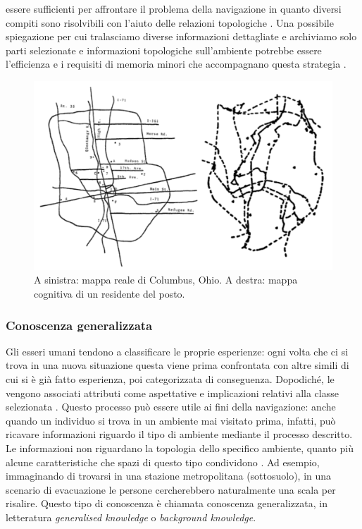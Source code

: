 \documentclass[12pt,a4paper,openright,oneside]{book}
\begin{document}
essere sufficienti per affrontare il problema della navigazione in quanto diversi compiti sono risolvibili con l'aiuto delle relazioni topologiche \cite{Ellard2009}. Una  possibile spiegazione per cui tralasciamo diverse informazioni dettagliate e archiviamo solo parti selezionate e informazioni topologiche sull'ambiente potrebbe essere l'efficienza e i requisiti di memoria minori che accompagnano questa strategia \cite{Ellard2009}.
\begin{figure}
	\centering
	\includegraphics[width=0.8\linewidth]{figures/cognitive-map-drawing.png}
	\caption{A sinistra: mappa reale di Columbus, Ohio. A destra: mappa cognitiva di un residente del posto.}
	\label{fig:cognitive-map-drawing}
\end{figure}


\subsubsection{Conoscenza generalizzata} 
Gli esseri umani tendono a classificare le proprie esperienze: ogni volta che ci si trova in una nuova situazione questa viene prima confrontata con altre simili di cui si è già fatto esperienza, poi categorizzata di conseguenza. Dopodiché, le vengono associati attributi come aspettative e implicazioni relativi alla classe selezionata \cite{Anderson2005, StPierre2014}. Questo processo può essere utile ai fini della navigazione: anche quando un individuo si trova in un ambiente mai visitato prima, infatti, può ricavare informazioni riguardo il tipo di ambiente mediante il processo descritto. Le informazioni non riguardano la topologia dello specifico ambiente, quanto più alcune caratteristiche che spazi di questo tipo condividono \cite{kalff2009, Wiener2009}. Ad esempio, immaginando di trovarsi in una stazione metropolitana (sottosuolo), in una scenario di evacuazione le persone cercherebbero naturalmente una scala per risalire. Questo tipo di conoscenza è chiamata conoscenza generalizzata, in letteratura \emph{generalised knowledge} o \emph{background knowledge}.
\end{document}
